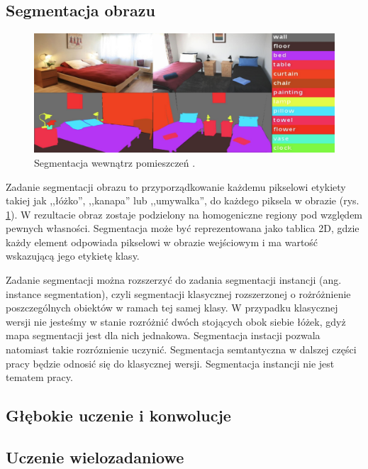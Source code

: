 \subsection{Segmentacja obrazu}
\begin{figure}[ht!]
    \includegraphics[width=\textwidth]{img/segment.png}
    \caption{Segmentacja wewnątrz pomieszczeń \cite{zhang2018context}.}
    \label{fig:segment}
  \end{figure}
  
Zadanie segmentacji obrazu to przyporządkowanie każdemu pikselowi etykiety takiej jak ,,łóżko'', ,,kanapa'' lub ,,umywalka'', do każdego piksela w obrazie (rys. \ref{fig:segment}). W rezultacie obraz zostaje podzielony na homogeniczne regiony pod względem pewnych własności. Segmentacja może być reprezentowana jako tablica 2D, gdzie każdy element odpowiada pikselowi w obrazie wejściowym i ma wartość wskazującą jego etykietę klasy.
  
Zadanie segmentacji można rozszerzyć do zadania segmentacji instancji (ang. instance segmentation), czyli segmentacji klasycznej rozszerzonej o rożróżnienie poszczególnych obiektów w ramach tej samej klasy. W przypadku klasycznej wersji nie jesteśmy w stanie rozróżnić dwóch stojących obok siebie łóżek, gdyż mapa segmentacji jest dla nich jednakowa. Segmentacja instacji pozwala natomiast takie rozróznienie uczynić. Segmentacja semtantyczna w dalszej części pracy będzie odnosić się do klasycznej wersji. Segmentacja instancji nie jest tematem pracy.

\subsection{Głębokie uczenie i konwolucje}
\subsection{Uczenie wielozadaniowe}
